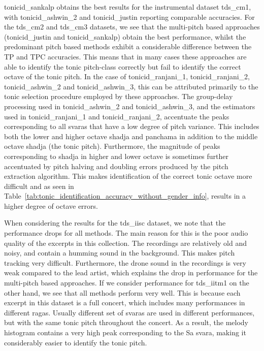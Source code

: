 {{\acrshort{tonicid_sankalp} obtains the best results for the instrumental dataset \acrshort{tds_cm1}, with \acrshort{tonicid_ashwin_2} and \acrshort{tonicid_justin} reporting comparable accuracies. For the \acrshort{tds_cm2} and \acrshort{tds_cm3} datasets, we see that the multi-pitch based approaches (\acrshort{tonicid_justin} and \acrshort{tonicid_sankalp}) obtain the best performance, whilst the predominant pitch based methods exhibit a considerable difference between the TP and TPC accuracies. This means that in many cases these approaches are able to identify the tonic pitch-class correctly but fail to identify the correct octave of the tonic pitch. In the case of \acrshort{tonicid_ranjani_1}, \acrshort{tonicid_ranjani_2}, \acrshort{tonicid_ashwin_2} and \acrshort{tonicid_ashwin_3}, this can be attributed primarily to the tonic selection procedure employed by these approaches. The group-delay processing used in \acrshort{tonicid_ashwin_2} and \acrshort{tonicid_ashwin_3}, and the estimators used in \acrshort{tonicid_ranjani_1} and \acrshort{tonicid_ranjani_2}, accentuate the peaks corresponding to all \glspl{svara} that have a low degree of pitch variance. This includes both the lower and higher octave \gls{shadja} and panchama in addition to the middle octave \gls{shadja} (the tonic pitch). Furthermore, the magnitude of peaks corresponding to \gls{shadja} in higher and lower octave is sometimes further accentuated by pitch halving and doubling errors produced by the pitch extraction algorithm. This makes identification of the correct tonic octave more difficult and as seen in Table~\ref{tab:tonic_identification_accuracy_without_gender_info}, results in a higher degree of octave errors.

When considering the results for the \acrshort{tds_iisc} dataset, we note that the performance drops for all methods. The main reason for this is the poor audio quality of the excerpts in this collection. The recordings are relatively old and noisy, and contain a humming sound in the background. This makes pitch
tracking very difficult. Furthermore, the drone sound in the recordings is very weak compared to the lead artist, which explains the drop in performance for the multi-pitch based approaches. If we consider performance for \acrshort{tds_iitm1} on the other hand, we see that all methods perform very well. This is because each excerpt in this dataset is a full concert, which includes many performances in different \glspl{raga}. Usually different set of \glspl{svara} are used in different performances, but with the same tonic pitch throughout the concert. As a result, the melody histogram contains a very high peak corresponding to the Sa \gls{svara}, making it considerably easier to identify the tonic pitch.

}}
